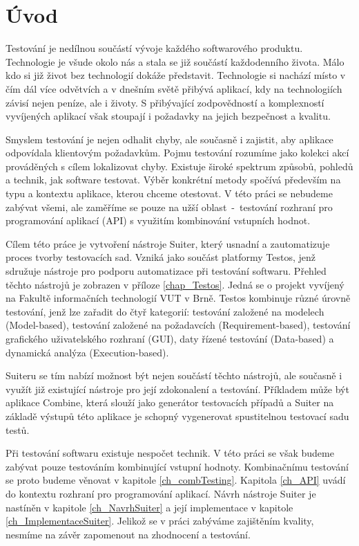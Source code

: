 \chapter{Úvod}
\label{ch_uvod}
Testování je nedílnou součástí vývoje každého softwarového produktu. Technologie je všude okolo nás a stala se již součástí každodenního života. Málo kdo si již život bez technologií dokáže představit. Technologie si nachází místo v čím dál více odvětvích a v dnešním světě přibývá aplikací, kdy na technologiích závisí nejen peníze, ale i životy. S přibývající zodpovědností a komplexností vyvíjených aplikací však stoupají i požadavky na jejich bezpečnost a kvalitu. 

Smyslem testování je nejen odhalit chyby, ale současně i zajistit, aby aplikace odpovídala klientovým požadavkům. Pojmu testování rozumíme jako kolekci akcí prováděných s cílem lokalizovat chyby. Existuje široké spektrum způsobů, pohledů a technik, jak software testovat. Výběr konkrétní metody spočívá především na typu a kontextu aplikace, kterou chceme otestovat. V této práci se nebudeme zabývat všemi, ale zaměříme se pouze na užší oblast~-~testování rozhraní pro programování aplikací (API) s využitím kombinování vstupních hodnot. 


Cílem této práce je vytvoření nástroje Suiter, který usnadní a zautomatizuje proces tvorby testovacích sad. Vzniká jako součást platformy Testos, jenž sdružuje nástroje pro podporu automatizace při testování softwaru. Přehled těchto nástrojů je zobrazen v příloze \ref{chap_Testos}. Jedná se o projekt vyvíjený na Fakultě informačních technologií VUT v Brně. Testos kombinuje různé úrovně testování, jenž lze zařadit do čtyř kategorií: testování založené na modelech (Model-based), testování založené na požadavcích (Requirement-based), testování grafického uživatelského rozhraní (GUI), daty řízené testování (Data-based) a dynamická analýza (Execution-based). 

Suiteru se tím nabízí možnost být nejen součástí těchto nástrojů, ale současně i využít již existující nástroje pro její zdokonalení a testování. Příkladem může být aplikace Combine, která slouží jako generátor testovacích případů a Suiter na základě výstupů této aplikace je schopný vygenerovat spustitelnou testovací sadu testů. 


Při testování softwaru existuje nespočet technik. V této práci se však budeme zabývat pouze testováním kombinující vstupní hodnoty. Kombinačnímu testování se proto budeme věnovat v kapitole \ref{ch_combTesting}. Kapitola \ref{ch_API} uvádí do kontextu rozhraní pro programování aplikací. Návrh nástroje Suiter je nastíněn v kapitole \ref{ch_NavrhSuiter} a její implementace v kapitole \ref{ch_ImplementaceSuiter}. Jelikož se v práci zabýváme zajištěním kvality, nesmíme na závěr zapomenout na zhodnocení a testování. 


